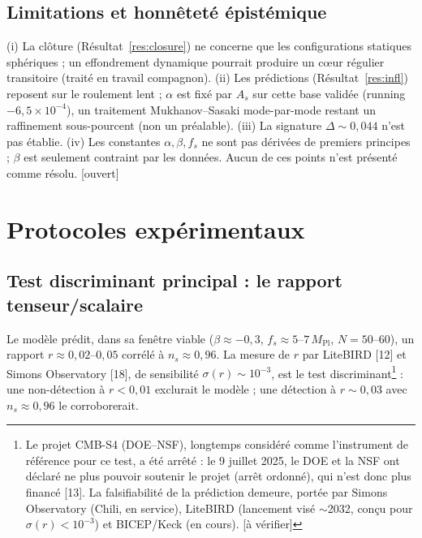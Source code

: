 \documentclass[11pt,a4paper]{article}
\newcommand{\statut}[1]{{\footnotesize\textsf{[#1]}}}
\newcommand{\Mpl}{M_{\mathrm{Pl}}}
\theoremstyle{plain}
\theoremstyle{remark}
\begin{document}
\subsection{Limitations et honn\^etet\'e \'epist\'emique}
(i) La cl\^oture (R\'esultat~\ref{res:closure}) ne concerne que les configurations statiques
sph\'eriques ; un effondrement dynamique pourrait produire un c\oe ur r\'egulier transitoire
(trait\'e en travail compagnon). (ii) Les pr\'edictions (R\'esultat~\ref{res:infl}) reposent
sur le roulement lent ; $\alpha$ est fix\'e par $A_s$ sur cette base valid\'ee (running
$-6{,}5\times10^{-4}$), un traitement Mukhanov--Sasaki mode-par-mode restant un
raffinement sous-pourcent (non un pr\'ealable). (iii) La signature $\Delta\sim0{,}044$
n'est pas \'etablie. (iv) Les constantes $\alpha,\beta,f_s$ ne sont pas d\'eriv\'ees de
premiers principes ; $\beta$ est seulement contraint par les donn\'ees. Aucun de ces
points n'est pr\'esent\'e comme r\'esolu. \statut{ouvert}

\section{Protocoles exp\'erimentaux}
\subsection{Test discriminant principal : le rapport tenseur/scalaire}
Le mod\`ele pr\'edit, dans sa fen\^etre viable ($\beta\approx-0{,}3$, $f_s\approx5$--$7\,\Mpl$,
$N=50$--$60$), un rapport $r\approx0{,}02$--$0{,}05$ corr\'el\'e \`a $n_s\approx0{,}96$. La
mesure de $r$ par LiteBIRD [12] et Simons Observatory [18], de sensibilit\'e
$\sigma(r)\sim10^{-3}$, est le test discriminant\footnote{Le projet CMB-S4 (DOE--NSF),
longtemps consid\'er\'e comme l'instrument de r\'ef\'erence pour ce test, a \'et\'e arr\^et\'e :
le 9 juillet 2025, le DOE et la NSF ont d\'eclar\'e ne plus pouvoir soutenir le projet
(arr\^et ordonn\'e), qui n'est donc plus financ\'e [13]. La falsifiabilit\'e de la pr\'ediction
demeure, port\'ee par Simons Observatory (Chili, en service), LiteBIRD (lancement vis\'e
$\sim$2032, con\c{c}u pour $\sigma(r)<10^{-3}$) et BICEP/Keck (en cours). \statut{\`a v\'erifier}}
: une non-d\'etection \`a $r<0{,}01$ exclurait le mod\`ele ; une d\'etection \`a $r\sim0{,}03$
avec $n_s\approx0{,}96$ le corroborerait.
\end{document}
